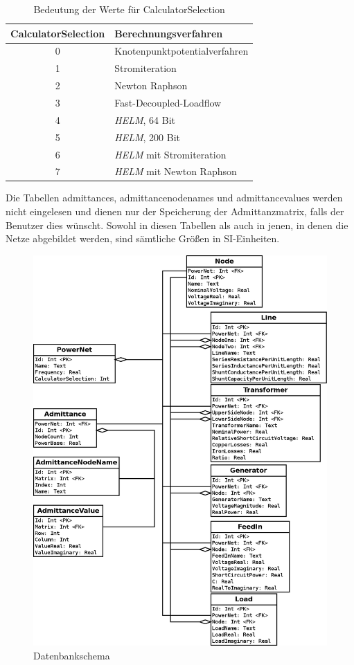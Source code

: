 \documentclass[12pt,a4paper]{article}
\begin{document}
	\begin{table}
		\centering
		\begin{tabular}{c|l}
			CalculatorSelection & Berechnungsverfahren \\ \hline
			0 & Knotenpunktpotentialverfahren \\
	        1 & Stromiteration \\
	        2 & Newton Raphson \\
	        3 & Fast-Decoupled-Loadflow \\
	        4 & \emph{HELM}, 64 Bit \\
	        5 & \emph{HELM}, 200 Bit \\
	        6 & \emph{HELM} mit Stromiteration \\
	        7 & \emph{HELM} mit Newton Raphson
		\end{tabular}
		\caption{Bedeutung der Werte für CalculatorSelection}
		\label{tab:calculator_selection}
	\end{table}
	
	Die Tabellen admittances, admittancenodenames und admittancevalues werden nicht eingelesen und dienen nur der Speicherung der Admittanzmatrix, falls der Benutzer dies wünscht. Sowohl in diesen Tabellen als auch in jenen, in denen die Netze abgebildet werden, sind sämtliche Größen in SI-Einheiten.
	
	\begin{figure}
		\centering
		\includegraphics[scale=0.35]{pictures/database_schema}
		\caption{Datenbankschema}
		\label{fig:database_schema}
	\end{figure}
	
\end{document}
